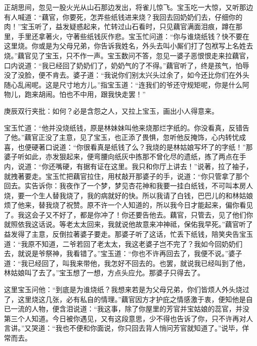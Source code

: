\begin{parag}
    正胡思间，忽见一股火光从山石那边发出，将雀儿惊飞。宝玉吃一大惊，又听那边有人喊道：“藕官，你要死，怎弄些纸钱进来烧？我回去回奶奶们去，仔细你的肉！”宝玉听了，益发疑惑起来，忙转过山石看时，只见藕官满面泪痕，蹲在那里，手里还拿著火，守著些纸钱灰作悲。宝玉忙问道：“你与谁烧纸钱？快不要在这里烧。你或是为父母兄弟，你告诉我姓名，外头去叫小厮们打了包袱写上名姓去烧。”藕官见了宝玉，只不作一声。宝玉数问不答，忽见一婆子恶恨恨走来拉藕官，口内说道：“我已经回了奶奶们了，奶奶气的了不得。”藕官听了，终是孩气，怕辱没了没脸，便不肯去。婆子道：“我说你们别太兴头过余了，如今还比你们在外头随心乱闹呢。这是尺寸地方儿。”指宝玉道：“连我们的爷还守规矩呢，你是什么阿物儿，跑来胡闹。怕也不中用，跟我快走罢！”\begin{note}庚辰双行夹批：如何？必是含怨之人，又拉上宝玉，画出小人得意来。\end{note}宝玉忙道：“他并没烧纸钱，原是林妹妹叫他来烧那烂字纸的。你没看真，反错告了他。”藕官正没了主意，见了宝玉，也正添了畏惧，忽听他反掩饰，心内转忧成喜，也便硬著口说道：“你很看真是纸钱了么？我烧的是林姑娘写坏了的字纸！”那婆子听如此，亦发狠起来，便弯腰向纸灰中拣那不曾化尽的遗纸，拣了两点在手内，说道：“你还嘴硬，有据有证在这里。我只和你厅上讲去！”说著，拉了袖子，就拽著要走。宝玉忙把藕官拉住，用杖敲开那婆子的手，说道：“你只管拿了那个回去。实告诉你：我夜作了一个梦，梦见杏花神和我要一挂白纸钱，不可叫本房人烧，要一个生人替我烧了，我的病就好的快。所以我请了白钱，巴巴儿的和林姑娘烦了他来，替我烧了祝赞。原不许一个人知道的，所以我今日才能起来，偏你看见了。我这会子又不好了，都是你冲了！你还要告他去。藕官，只管去，见了他们你就照依我这话说。等老太太回来，我就说他故意来冲神祗，保佑我早死。”藕官听了益发得了主意，反倒拉著婆子要走。那婆子听了这话，忙丢下纸钱，陪笑央告宝玉道：“我原不知道，二爷若回了老太太，我这老婆子岂不完了？我如今回奶奶们去，就说是爷祭神，我看错了。”宝玉道：“你也不许再回去了，我便不说。”婆子道：“我已经回了，叫我来带他，我怎好不回去的。也罢，就说我已经叫到了他，林姑娘叫了去了。”宝玉想了一想，方点头应允。那婆子只得去了。
\end{parag}


\begin{parag}
    这里宝玉问他：“到底是为谁烧纸？我想来若是为父母兄弟，你们皆烦人外头烧过了，这里烧这几张，必有私自的情理。”藕官因方才护庇之情感激于衷，便知他是自已一流的人物，便含泪说道：“我这事，除了你屋里的芳官并宝姑娘的蕊官，并没第三个人知道。今日被你遇见，又有这段意思，少不得也告诉了你，只不许再对人言讲。”又哭道：“我也不便和你面说，你只回去背人悄问芳官就知道了。”说毕，佯常而去。
\end{parag}


